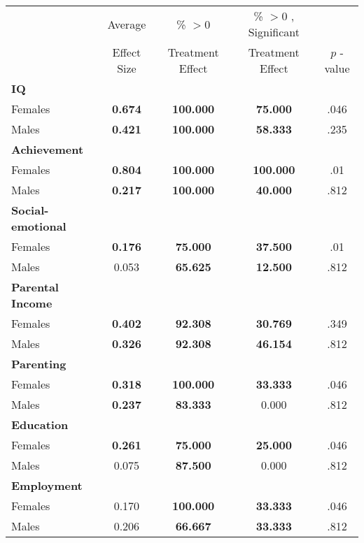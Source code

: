 \begin{tabular}{l c c c c}
\toprule
 & Average & \% $ >0 $ & \% $ >0 $ , Significant & \citet{Rosenbaum_2005_Distribution_JRSS} \\
 & Effect Size & Treatment Effect & Treatment Effect & $ p $ -value \\
\midrule
\textbf{IQ} & & & & \\
\quad Females &  \textbf{    0.674} & \textbf{  100.000} & \textbf{   75.000} & .046 \\
\quad Males &  \textbf{    0.421} & \textbf{  100.000} & \textbf{   58.333} & .235 \\
\midrule
\textbf{Achievement} & & & & \\
\quad Females &  \textbf{    0.804} & \textbf{  100.000} & \textbf{  100.000} & .01 \\
\quad Males &  \textbf{    0.217} & \textbf{  100.000} & \textbf{   40.000} & .812 \\
\midrule
\textbf{Social-emotional} & & & & \\
\quad Females &  \textbf{    0.176} & \textbf{   75.000} & \textbf{   37.500} & .01 \\
\quad Males &      0.053 & \textbf{   65.625} & \textbf{   12.500} & .812 \\
\midrule
\textbf{Parental Income} & & & & \\
\quad Females &  \textbf{    0.402} & \textbf{   92.308} & \textbf{   30.769} & .349 \\
\quad Males &  \textbf{    0.326} & \textbf{   92.308} & \textbf{   46.154} & .812 \\
\midrule
\textbf{Parenting} & & & & \\
\quad Females &  \textbf{    0.318} & \textbf{  100.000} & \textbf{   33.333} & .046 \\
\quad Males &  \textbf{    0.237} & \textbf{   83.333} &     0.000 & .812 \\
\midrule
\textbf{Education} & & & & \\
\quad Females &  \textbf{    0.261} & \textbf{   75.000} & \textbf{   25.000} & .046 \\
\quad Males &      0.075 & \textbf{   87.500} &     0.000 & .812 \\
\midrule
\textbf{Employment} & & & & \\
\quad Females &      0.170 & \textbf{  100.000} & \textbf{   33.333} & .046 \\
\quad Males &      0.206 & \textbf{   66.667} & \textbf{   33.333} & .812 \\

\end{tabular}
